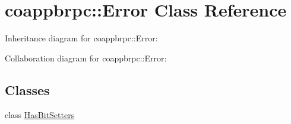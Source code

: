 \hypertarget{classcoappbrpc_1_1Error}{}\section{coappbrpc\+:\+:Error Class Reference}
\label{classcoappbrpc_1_1Error}


Inheritance diagram for coappbrpc\+:\+:Error\+:


Collaboration diagram for coappbrpc\+:\+:Error\+:
\subsection*{Classes}
\begin{DoxyCompactItemize}
\item 
class \hyperlink{classcoappbrpc_1_1Error_1_1HasBitSetters}{Has\+Bit\+Setters}
\end{DoxyCompactItemize}
